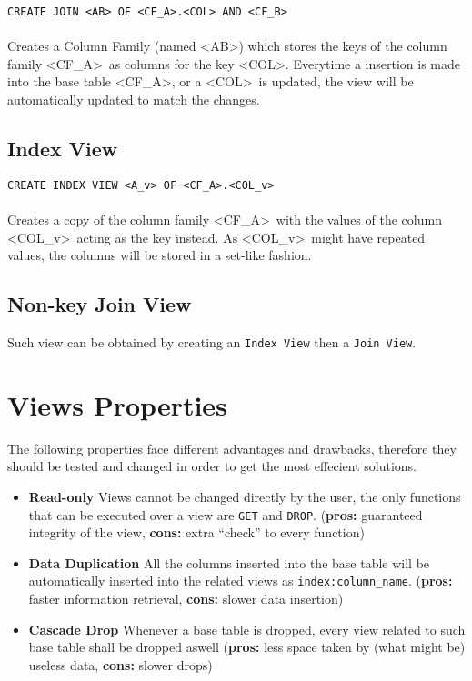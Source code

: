 \documentclass[preprint,12pt]{elsarticle}
\begin{document}
\texttt{CREATE JOIN \textless AB\textgreater\ OF \textless CF\_A\textgreater.\textless COL\textgreater\ AND \textless CF\_B\textgreater}
\\\\Creates a Column Family (named \textless AB\textgreater) which stores the keys of the column family \textless CF\_A\textgreater\ as columns for the key \textless COL\textgreater.
Everytime a insertion is made into the base table \textless CF\_A\textgreater, or a \textless COL\textgreater\ is updated, the view will be automatically updated to match the changes.
\subsection{\bf Index View}
\texttt{CREATE INDEX VIEW \textless A\_v\textgreater\ OF \textless CF\_A\textgreater.\textless COL\_v\textgreater} 
\\\\Creates a copy of the column family \textless CF\_A\textgreater\ with the values of the column \textless COL\_v\textgreater\ acting as the key instead. As \textless COL\_v\textgreater\ might have repeated values, the columns will be stored in a set-like fashion.
\subsection{\bf Non-key Join View}
Such view can be obtained by creating an \texttt{Index View} then a \texttt{Join View}.

\section{Views Properties}
The following properties face different advantages and drawbacks, therefore they should be tested and changed in order to get the most effecient solutions.
\begin{itemize}
\item{\bf Read-only}
\subitem Views cannot be changed directly by the user, the only functions that can be executed over a view are \texttt{GET} and \texttt{DROP}. ({\bf pros:} guaranteed integrity of the view, {\bf cons:} extra ``check'' to every function)
\item {\bf Data Duplication}
\subitem All the columns inserted into the base table will be automatically inserted into the related views as \texttt{index:column\_name}. ({\bf pros:} faster information retrieval, {\bf cons:} slower data insertion)
\item {\bf Cascade Drop}
\subitem Whenever a base table is dropped, every view related to such base table shall be dropped aswell ({\bf pros:} less space taken by (what might be) useless data, {\bf cons:} slower drops)
\end{itemize}
\end{document}
